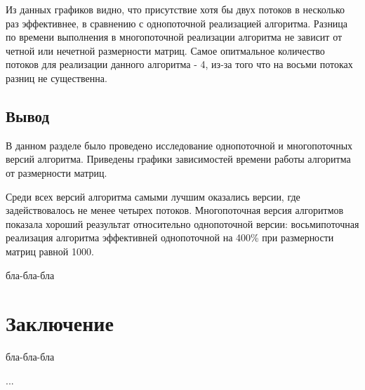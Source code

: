 \documentclass[12pt, a4paper]{report}
\begin{document}
	Из данных графиков видно, что присутствие хотя бы двух потоков в несколько раз эффективнее, в сравнению с однопоточной реализацией алгоритма. Разница по времени выполнения в многопоточной реализации алгоритма не зависит от четной или нечетной размерности матриц. Самое опитмальное количество потоков для реализации данного алгоритма - 4, из-за того что на восьми потоках разниц не существенна. 
	\newpage
	
	\section{Вывод}
	
	\hspace{0.6cm}В данном разделе было проведено исследование однопоточной и многопоточных версий алгоритма. Приведены графики зависимостей времени работы алгоритма от размерности матриц.
	
	\vspace{0.3cm}Среди всех версий алгоритма самыми лучшим оказались версии, где задействовалось не менее четырех потоков. Многопоточная версия алгоритмов показала хороший реазультат относительно однопоточной версии: восьмипоточная реализация алгоритма эффективней однопоточной на 400\% при размерности матриц равной 1000.

	\newpage
	
 	бла-бла-бла

	\chapter*{Заключение}
	бла-бла-бла
	
	\newpage
	
	\begin{thebibliography}{}
	\bibitem ...
	\end{thebibliography}
\end{document}
